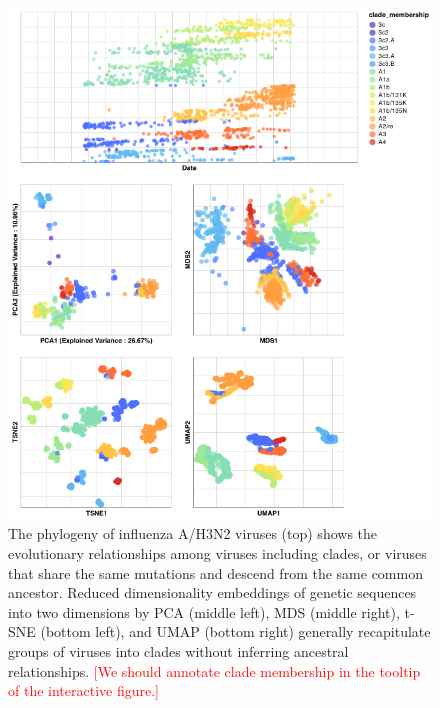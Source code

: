\documentclass[9pt,lineno]{elife}
\def\jhc#1{\textcolor{red}{[#1]}}
\begin{document}
\begin{figure}[htb]
  \begin{center}
  \includegraphics[width=\columnwidth]{flu-embeddings}
  \caption{
    The phylogeny of influenza A/H3N2 viruses (top) shows the evolutionary relationships among viruses including clades, or viruses that share the same mutations and descend from the same common ancestor.
    Reduced dimensionality embeddings of genetic sequences into two dimensions by PCA (middle left), MDS (middle right), t-SNE (bottom left), and UMAP (bottom right) generally recapitulate groups of viruses into clades without inferring ancestral relationships.
    \jhc{We should annotate clade membership in the tooltip of the interactive figure.}
  }
  \label{fig:seasonal-influenza-h3n2-ha-embeddings}
  \end{center}
\end{figure}
\end{document}
